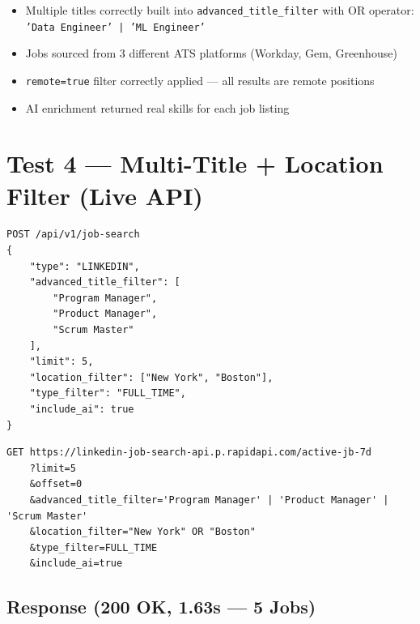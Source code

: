 \documentclass[11pt, a4paper]{article}
\begin{document}
\begin{successbox}
\begin{itemize}[leftmargin=1.5em, itemsep=2pt]
    \item Multiple titles correctly built into \texttt{advanced\_title\_filter} with OR operator: \texttt{'Data Engineer' | 'ML Engineer'}
    \item Jobs sourced from 3 different ATS platforms (Workday, Gem, Greenhouse)
    \item \texttt{remote=true} filter correctly applied --- all results are remote positions
    \item AI enrichment returned real skills for each job listing
\end{itemize}
\end{successbox}

\newpage
\section{Test 4 --- Multi-Title + Location Filter (Live API)}

\begin{lstlisting}[style=apistyle, title=\color{codetext}Request]
POST /api/v1/job-search
{
    "type": "LINKEDIN",
    "advanced_title_filter": [
        "Program Manager",
        "Product Manager",
        "Scrum Master"
    ],
    "limit": 5,
    "location_filter": ["New York", "Boston"],
    "type_filter": "FULL_TIME",
    "include_ai": true
}
\end{lstlisting}

\begin{lstlisting}[style=apistyle, title=\color{codetext}Query Sent to RapidAPI]
GET https://linkedin-job-search-api.p.rapidapi.com/active-jb-7d
    ?limit=5
    &offset=0
    &advanced_title_filter='Program Manager' | 'Product Manager' | 'Scrum Master'
    &location_filter="New York" OR "Boston"
    &type_filter=FULL_TIME
    &include_ai=true
\end{lstlisting}

\subsection{Response (200 OK, 1.63s --- 5 Jobs)}
\end{document}
